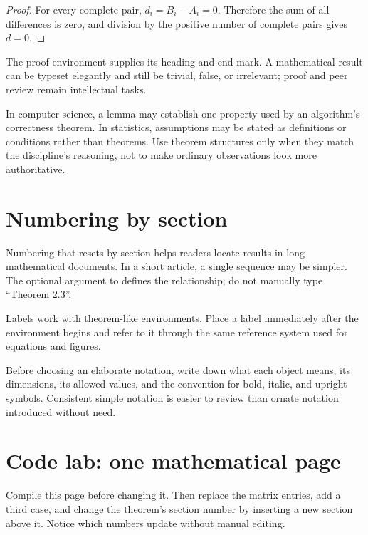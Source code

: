 \begin{proof}
For every complete pair, \(d_i=B_i-A_i=0\). Therefore the sum of all
differences is zero, and division by the positive number of complete pairs
gives \(\bar d=0\).
\end{proof}

The proof environment supplies its heading and end mark. A mathematical result
can be typeset elegantly and still be trivial, false, or irrelevant; proof and
peer review remain intellectual tasks.

\begin{scienceinpractice}
In computer science, a lemma may establish one property used by an algorithm's
correctness theorem. In statistics, assumptions may be stated as definitions
or conditions rather than theorems. Use theorem structures only when they
match the discipline's reasoning, not to make ordinary observations look more
authoritative.
\end{scienceinpractice}

\section{Numbering by section}

Numbering that resets by section helps readers locate results in long
mathematical documents. In a short article, a single sequence may be simpler.
The optional argument to  defines the relationship; do not
manually type ``Theorem 2.3''.

Labels work with theorem-like environments. Place a label immediately after
the environment begins and refer to it through the same reference system used
for equations and figures.

\begin{goodpractice}
Before choosing an elaborate notation, write down what each object means, its
dimensions, its allowed values, and the convention for bold, italic, and
upright symbols. Consistent simple notation is easier to review than ornate
notation introduced without need.
\end{goodpractice}

\section{Code lab: one mathematical page}

\begin{codelab}
Compile this page before changing it. Then replace the matrix entries, add a
third case, and change the theorem's section number by inserting a new section
above it. Notice which numbers update without manual editing.
\end{codelab}


